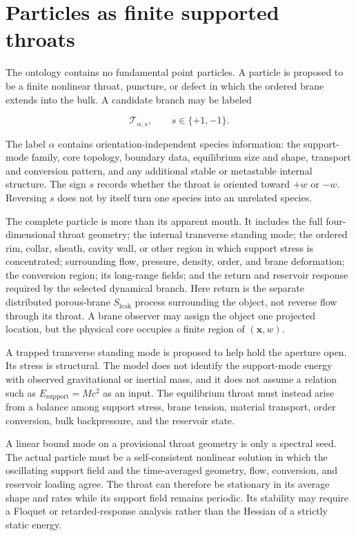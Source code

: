 \section{Particles as finite supported throats}

The ontology contains no fundamental point particles. A particle is proposed to
be a finite nonlinear throat, puncture, or defect in which the ordered brane
extends into the bulk. A candidate branch may be labeled

\[
\mathcal T_{\alpha,s},
\qquad
s\in\{+1,-1\}.
\]

The label \(\alpha\) contains orientation-independent species information: the
support-mode family, core topology, boundary data, equilibrium size and shape,
transport and conversion pattern, and any additional stable or metastable
internal structure. The sign \(s\) records whether the throat is oriented toward
\(+w\) or \(-w\). Reversing \(s\) does not by itself turn one species into an
unrelated species.

The complete particle is more than its apparent mouth. It includes the full
four-dimensional throat geometry; the internal transverse standing mode; the
ordered rim, collar, sheath, cavity wall, or other region in which support stress
is concentrated; surrounding flow, pressure, density, order, and brane
deformation; the conversion region; its long-range fields; and the return and
reservoir response required by the selected dynamical branch. Here return is the
separate distributed porous-brane \(S_{\mathrm{leak}}\) process surrounding the
object, not reverse flow through its throat. A brane observer may assign the
object one projected location, but the physical core occupies a finite region of
\((\mathbf x,w)\).

A trapped transverse standing mode is proposed to help hold the aperture open.
Its stress is structural. The model does not identify the support-mode energy
with observed gravitational or inertial mass, and it does not assume a relation
such as \(E_{\mathrm{support}}=Mc^2\) as an input. The equilibrium throat must
instead arise from a balance among support stress, brane tension, material
transport, order conversion, bulk backpressure, and the reservoir state.

A linear bound mode on a provisional throat geometry is only a spectral seed.
The actual particle must be a self-consistent nonlinear solution in which the
oscillating support field and the time-averaged geometry, flow, conversion, and
reservoir loading agree. The throat can therefore be stationary in its average
shape and rates while its support field remains periodic. Its stability may
require a Floquet or retarded-response analysis rather than the Hessian of a
strictly static energy.

